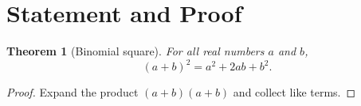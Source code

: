 \documentclass[11pt]{article}
\newtheorem{theorem}{Theorem}
\begin{document}
\section*{Statement and Proof}

\begin{theorem}[Binomial square]
For all real numbers $a$ and $b$,
\[
  (a+b)^2 = a^2 + 2ab + b^2.
\]
\end{theorem}

\begin{proof}
Expand the product $(a+b)(a+b)$ and collect like terms.
\end{proof}
\end{document}
